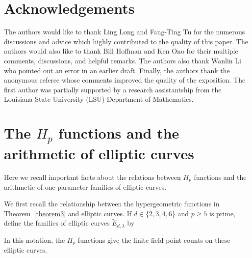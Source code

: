 \documentclass[12pt]{amsart}
\theoremstyle{definition}
\theoremstyle{remark}
\numberwithin{equation}{section}
\begin{document}
\section*{Acknowledgements}
The authors would like to thank Ling Long and Fang-Ting Tu for the numerous discussions and advice which highly contributed to the quality of this paper.
The authors would also like to thank Bill Hoffman and Ken Ono for their multiple comments, discussions, and helpful remarks. The authors also thank Wanlin Li who pointed out an error in an earlier draft. Finally, the authors thank the anonymous referee whose comments improved the quality of the exposition.
The first author was partially supported by a research assistantship from the Louisiana State University (LSU) Department of Mathematics.

\section{The \texorpdfstring{$H_p$}{Hp} functions and the arithmetic of elliptic curves}\label{Section2}

Here we recall important facts about the relations between $H_p$ functions and the arithmetic of one-parameter families of elliptic curves.

We first recall the relationship between the hypergeometric functions in Theorem~\ref{theorem3} and elliptic curves. If $d\in\{2,3,4,6\}$ and $p\geq 5$ is prime, define the families of elliptic curves $\widetilde{E}_{d,\lambda}$ by
\renewcommand{\arraystretch}{1.2}
\begin{table}[H]
\begin{center}
\end{center}
\caption{}\label{TableEC}
\end{table}
\renewcommand{\arraystretch}{1}
In this notation, the $H_p$ functions give the finite field point counts on these elliptic curves.
\end{document}
